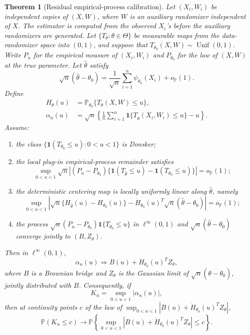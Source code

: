 \documentclass[preprint,12pt]{elsarticle}
\newcommand{\Prob}{\mathbb{P}}
\theoremstyle{plain}
\newtheorem{theorem}{Theorem}[section]
\theoremstyle{remark}
\begin{document}
\begin{theorem}[Residual empirical-process calibration]
\label{thm:residual-crossing-principle}
Let $(X_i,W_i)$ be independent copies of $(X,W)$, where $W$ is an auxiliary
randomizer independent of $X$. The estimator is computed from the observed
$X_i$'s before the auxiliary randomizers are generated. Let
$\{T_\theta:\theta\in\Theta\}$ be measurable maps from the data-randomizer
space into $(0,1)$, and suppose that
$T_{\theta_0}(X,W)\sim\operatorname{Unif}(0,1)$. Write $P_n$ for the empirical
measure of $(X_i,W_i)$ and $P_{\theta_0}$ for the law of $(X,W)$ at the true
parameter. Let $\widehat\theta$ satisfy
\[
\sqrt n(\widehat\theta-\theta_0)
=\frac{1}{\sqrt n}\sum_{i=1}^n\psi_{\theta_0}(X_i)+o_{\mathbb P}(1).
\]
Define
\[
\begin{aligned}
H_\theta(u)
&=\Prob_{\theta_0}\{T_\theta(X,W)\le u\},\\
\alpha_n(u)
&=\sqrt n\left\{\frac{1}{n}\sum_{i=1}^n
\mathbf 1\{T_{\widehat\theta}(X_i,W_i)\le u\}-u\right\}.
\end{aligned}
\]
Assume:
\begin{enumerate}
\item the class $\{\mathbf 1(T_{\theta_0}\le u):0<u<1\}$ is Donsker;
\item the local plug-in empirical-process remainder satisfies
\[
\sup_{0<u<1}\sqrt n\left|
(P_n-P_{\theta_0})\{\mathbf 1(T_{\widehat\theta}\le u)
-\mathbf 1(T_{\theta_0}\le u)\}\right|=o_{\mathbb P}(1);
\]
\item the deterministic centering map is locally uniformly linear along
$\widehat\theta$, namely
\[
\sup_{0<u<1}\left|
\sqrt n\{H_{\widehat\theta}(u)-H_{\theta_0}(u)\}
-\dot H_{\theta_0}(u)^T\sqrt n(\widehat\theta-\theta_0)
\right|=o_{\mathbb P}(1);
\]
\item the process
$\sqrt n(P_n-P_{\theta_0})\mathbf 1\{T_{\theta_0}\le u\}$ in
$\ell^\infty(0,1)$ and $\sqrt n(\widehat\theta-\theta_0)$ converge jointly to
$(B,Z_\theta)$.
\end{enumerate}
Then in $\ell^\infty(0,1)$,
\[
\alpha_n(u)\Rightarrow B(u)+\dot H_{\theta_0}(u)^T Z_\theta,
\]
where $B$ is a Brownian bridge and $Z_\theta$ is the Gaussian limit of
$\sqrt n(\widehat\theta-\theta_0)$, jointly distributed with $B$.
Consequently, if
\[
K_n=\sup_{0<u<1}|\alpha_n(u)|,
\]
then at continuity points $c$ of the law of
$\sup_{0<u<1}|B(u)+\dot H_{\theta_0}(u)^T Z_\theta|$,
\[
\mathbb P(K_n\le c)\to
\mathbb P\left\{\sup_{0<u<1}|B(u)+\dot H_{\theta_0}(u)^T Z_\theta|\le c\right\}.
\]
\end{theorem}
\end{document}
